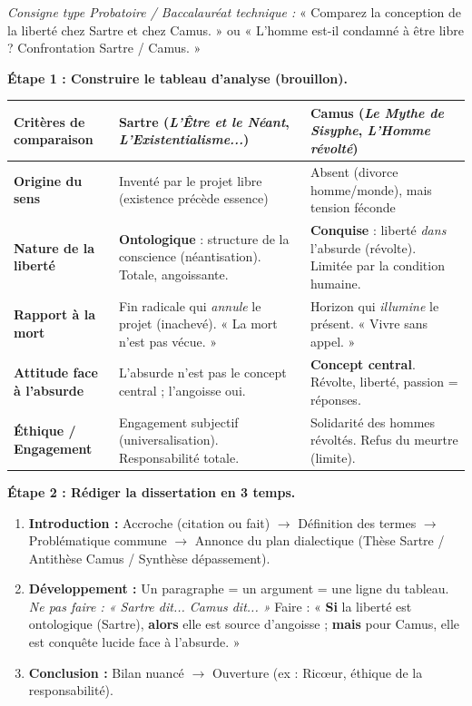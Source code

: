 \documentclass[11pt]{article}
\begin{document}
\begin{methode}
\emph{Consigne type Probatoire / Baccalauréat technique :} « Comparez la conception de la liberté chez Sartre et chez Camus. » ou « L'homme est-il condamné à être libre ? Confrontation Sartre / Camus. »

\textbf{Étape 1 : Construire le tableau d'analyse (brouillon).}
\begin{center}
\begin{tabularx}{\linewidth}{|l|X|X|}\hline
\textbf{Critères de comparaison} & \textbf{Sartre (\emph{L'Être et le Néant}, \emph{L'Existentialisme...})} & \textbf{Camus (\emph{Le Mythe de Sisyphe}, \emph{L'Homme révolté})} \\\hline
\textbf{Origine du sens} & Inventé par le projet libre (existence précède essence) & Absent (divorce homme/monde), mais tension féconde \\\hline
\textbf{Nature de la liberté} & \textbf{Ontologique} : structure de la conscience (néantisation). Totale, angoissante. & \textbf{Conquise} : liberté \emph{dans} l'absurde (révolte). Limitée par la condition humaine. \\\hline
\textbf{Rapport à la mort} & Fin radicale qui \emph{annule} le projet (inachevé). « La mort n'est pas vécue. » & Horizon qui \emph{illumine} le présent. « Vivre sans appel. » \\\hline
\textbf{Attitude face à l'absurde} & L'absurde n'est pas le concept central ; l'angoisse oui. & \textbf{Concept central}. Révolte, liberté, passion = réponses. \\\hline
\textbf{Éthique / Engagement} & Engagement subjectif (universalisation). Responsabilité totale. & Solidarité des hommes révoltés. Refus du meurtre (limite). \\\hline
\end{tabularx}
\end{center}

\textbf{Étape 2 : Rédiger la dissertation en 3 temps.}
\begin{enumerate}
    \item \textbf{Introduction :} Accroche (citation ou fait) $\rightarrow$ Définition des termes $\rightarrow$ Problématique commune $\rightarrow$ Annonce du plan dialectique (Thèse Sartre / Antithèse Camus / Synthèse dépassement).
    \item \textbf{Développement :} Un paragraphe = un argument = une ligne du tableau. \emph{Ne pas faire : « Sartre dit... Camus dit... »} Faire : « \textbf{Si} la liberté est ontologique (Sartre), \textbf{alors} elle est source d'angoisse ; \textbf{mais} pour Camus, elle est conquête lucide face à l'absurde. »
    \item \textbf{Conclusion :} Bilan nuancé $\rightarrow$ Ouverture (ex : Ricœur, éthique de la responsabilité).
\end{enumerate}
\end{methode}
\end{document}
